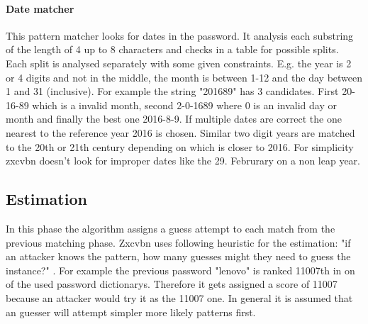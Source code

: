 \documentclass[12pt,a4paper]{article}
\begin{document}

\paragraph{Date matcher}
This pattern matcher looks for dates in the password. It analysis each substring of the length of 4 up to 8 characters and checks in a table for possible splits. Each split is analysed separately with some given constraints. E.g. the year is 2 or 4 digits and not in the middle, the month is between 1-12 and the day between 1 and 31 (inclusive). 
For example the string "201689" has 3 candidates. First 20-16-89 which is a invalid month, second 2-0-1689 where 0 is an invalid day or month and finally the best one 2016-8-9. If multiple dates are correct the one nearest to the reference year 2016 is chosen. Similar two digit years are matched to the 20th or 21th century depending on which is closer to 2016. For simplicity zxcvbn doesn't look for improper dates like the 29. Februrary on a non leap year.






\subsection{Estimation}

In this phase the algorithm assigns a guess attempt to each match from the previous matching phase.
Zxcvbn uses following heuristic for the estimation: "if an attacker knows the pattern, how many guesses might they need to guess the instance?" \cite{zxcvbn}. For example the previous password "lenovo" is ranked 11007th in on of the used password dictionarys. Therefore it gets assigned a score of 11007 because an attacker would try it as the 11007 one. In general it is assumed that an guesser will attempt simpler more likely patterns first.
\end{document}
